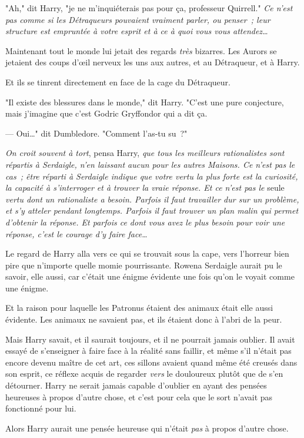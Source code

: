 "Ah," dit Harry, "je ne m'inquiéterais pas pour ça, professeur Quirrell." \emph{Ce n'est pas comme si les Détraqueurs pouvaient vraiment parler, ou penser~; leur structure est empruntée à votre esprit et à ce à quoi vous vous attendez…}

Maintenant tout le monde lui jetait des regards \emph{très} bizarres. Les Aurors se jetaient des coups d'œil nerveux les uns aux autres, et au Détraqueur, et à Harry.

Et ils se tinrent directement en face de la cage du Détraqueur.

"Il existe des blessures dans le monde," dit Harry. "C'est une pure conjecture, mais j'imagine que c'est Godric Gryffondor qui a dit ça.

--- Oui…" dit Dumbledore. "Comment l'as-tu su~?"

\emph{On croit souvent à tort}, pensa Harry, \emph{que tous les meilleurs rationalistes sont répartis à Serdaigle, n'en laissant aucun pour les autres Maisons. Ce n'est pas le cas~; être réparti à Serdaigle indique que votre vertu la plus forte est la curiosité, la capacité à s'interroger et à trouver la vraie réponse. Et ce n'est pas le} seule \emph{vertu dont un rationaliste a besoin. Parfois il faut travailler dur sur un problème, et s'y atteler pendant longtemps. Parfois il faut trouver un plan malin qui permet d'obtenir la réponse. Et parfois ce dont vous avez le plus besoin pour voir une réponse, c'est le courage d'y faire face…}

Le regard de Harry alla vers ce qui se trouvait sous la cape, vers l'horreur bien pire que n'importe quelle momie pourrissante. Rowena Serdaigle aurait pu le savoir, elle aussi, car c'était une énigme évidente une fois qu'on le voyait comme une énigme.

Et la raison pour laquelle les Patronus étaient des animaux était elle aussi évidente. Les animaux ne savaient pas, et ils étaient donc à l'abri de la peur.

Mais Harry savait, et il saurait toujours, et il ne pourrait jamais oublier. Il avait essayé de s'enseigner à faire face à la réalité sans faillir, et même s'il n'était pas encore devenu maître de cet art, ces sillons avaient quand même été creusés dans son esprit, ce réflexe acquis de regarder \emph{vers} le douloureux plutôt que de s'en détourner. Harry ne serait jamais capable d'oublier en ayant des pensées heureuses à propos d'autre chose, et c'est pour cela que le sort n'avait pas fonctionné pour lui.

Alors Harry aurait une pensée heureuse qui n'était \emph{pas} à propos d'autre chose.


